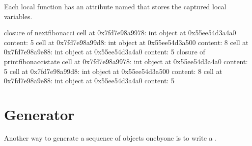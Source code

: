 \documentclass[letterpaper,10pt,english]{sphinxmanual}
\begin{document}
Each local function has an attribute named  that stores the captured local variables.

\begin{sphinxVerbatim}[commandchars=\\\{\}]
 
     
       
         


\end{sphinxVerbatim}

\begin{sphinxVerbatim}[commandchars=\\\{\}]
closure of  next\PYGZus{}fibonacci
    \PYGZlt{}cell at 0x7fd7e98a9978: int object at 0x55ee54d3a4a0\PYGZgt{} content: 5
    \PYGZlt{}cell at 0x7fd7e98a99d8: int object at 0x55ee54d3a500\PYGZgt{} content: 8
    \PYGZlt{}cell at 0x7fd7e98a9e88: int object at 0x55ee54d3a4a0\PYGZgt{} content: 5
closure of  print\PYGZus{}fibonacci\PYGZus{}state
    \PYGZlt{}cell at 0x7fd7e98a9978: int object at 0x55ee54d3a4a0\PYGZgt{} content: 5
    \PYGZlt{}cell at 0x7fd7e98a99d8: int object at 0x55ee54d3a500\PYGZgt{} content: 8
    \PYGZlt{}cell at 0x7fd7e98a9e88: int object at 0x55ee54d3a4a0\PYGZgt{} content: 5
\end{sphinxVerbatim}


\section{Generator}
\label{\detokenize{Lecture6/More on Functions:generator}}
Another way to generate a sequence of objects one\sphinxhyphen{}by\sphinxhyphen{}one is to write a .
\end{document}
